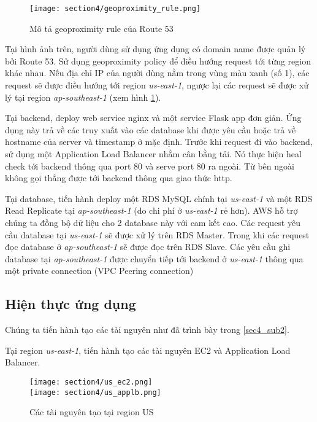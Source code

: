 \begin{figure}
    \centering
    \texttt{[image: section4/geoproximity\_rule.png]}
    \caption{Mô tả geoproximity rule của Route 53}
    \label{fig:sec4-geoproximity_rule}
\end{figure}

Tại hình ảnh trên, người dùng sử dụng ứng dụng có domain name được quản lý bởi Route 53. Sử dụng geoproximity policy để điều hướng request tới từng region khác nhau. Nếu địa chỉ IP của người dùng nằm trong vùng màu xanh (số 1), các request sẽ được điều hướng tới region \textit{us-east-1}, ngược lại các request sẽ được xử lý tại region \textit{ap-southeast-1} (xem hình \ref{fig:sec4-geoproximity_rule}).

Tại backend, deploy web service nginx và một service Flask app đơn giản. Ứng dụng này trả về các truy xuất vào các database khi được yêu cầu hoặc trả về hostname của server và timestamp ở mặc định. Trước khi request đi vào backend, sử dụng một Application Load Balancer nhằm cân bằng tải. Nó thực hiện heal check tới backend thông qua port 80 và serve port 80 ra ngoài. Từ bên ngoài không gọi thẳng được tới backend thông qua giao thức http.

Tại database, tiến hành deploy một RDS MySQL chính tại \textit{us-east-1} và một RDS Read Replicate tại \textit{ap-southeast-1} (do chi phí ở \textit{us-east-1} rẻ hơn). AWS hỗ trợ chúng ta đồng bộ dữ liệu cho 2 database này với cam kết cao. Các request yêu cầu database tại \textit{us-east-1} sẽ được xử lý trên RDS Master. Trong khi các request đọc database ở \textit{ap-southeast-1} sẽ được đọc trên RDS Slave. Các yêu cầu ghi database tại \textit{ap-southeast-1} được chuyển tiếp tới backend ở \textit{us-east-1} thông qua một private connection (VPC Peering connection)

\subsection{Hiện thực ứng dụng}

Chúng ta tiến hành tạo các tài nguyên như đã trình bày trong \ref{sec4_sub2}.

Tại region \textit{us-east-1}, tiến hành tạo các tài nguyên EC2 và Application Load Balancer.

\begin{figure}
    \centering
    \texttt{[image: section4/us\_ec2.png]} \\
    \texttt{[image: section4/us\_applb.png]}
    \caption{Các tài nguyên tạo tại region US}
    \label{fig:us-resources}
\end{figure}

